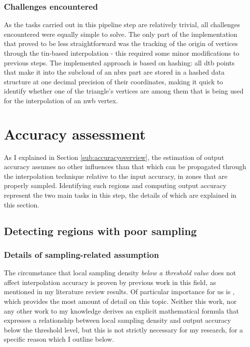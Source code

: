\subsubsection{Challenges encountered}

As the tasks carried out in this pipeline step are relatively trivial, all challenges encountered were equally simple to solve. The only part of the implementation that proved to be less straightforward was the tracking of the origin of vertices through the \ac{tin}-based interpolation - this required some minor modifications to previous steps. The implemented approach is based on hashing: all \ac{dtb} points that make it into the subcloud of an \ac{nbrs} part are stored in a hashed data structure at one decimal precision of their coordinates, making it quick to identify whether one of the triangle's vertices are among them that is being used for the interpolation of an \ac{nwb} vertex.

\section{Accuracy assessment}
\label{sec:m_accuracyassessment}

As I explained in Section \ref{sub:accuracyoverview}, the estimation of output accuracy assumes no other influences than that which can be propagated through the interpolation technique relative to the input accuracy, in zones that are properly sampled. Identifying such regions and computing output accuracy represent the two main tasks in this step, the details of which are explained in this section.

\subsection{Detecting regions with poor sampling}
\label{sub:m_accuracypoorsampling}

\subsubsection{Details of sampling-related assumption}

The circumstance that local sampling density \textit{below a threshold value} does not affect interpolation accuracy is proven by previous work in this field, as mentioned in my literature review results. Of particular importance for us is \cite{guo_etal_2010}, which provides the most amount of detail on this topic. Neither this work, nor any other work to my knowledge derives an explicit mathematical formula that expresses a relationship between local sampling density and output accuracy below the threshold level, but this is not strictly necessary for my research, for a specific reason which I outline below.

